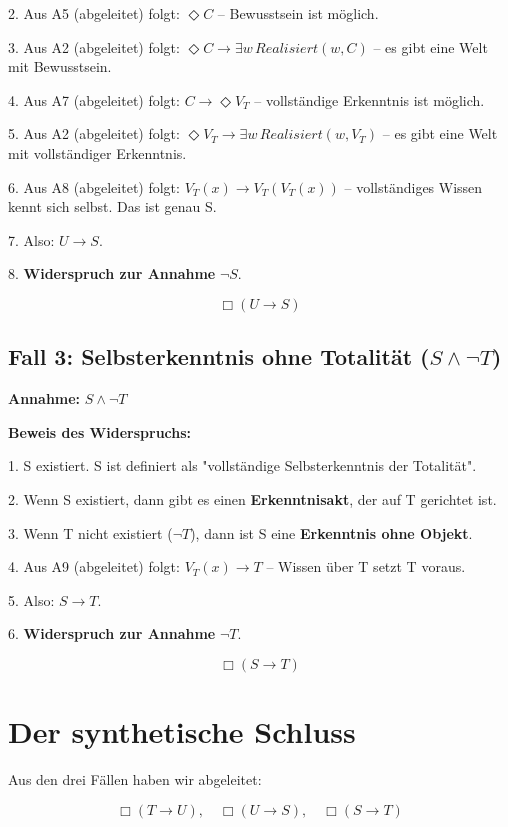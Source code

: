 \documentclass[
]{article}
\begin{document}
2. Aus A5 (abgeleitet) folgt: \(\Diamond C\) – Bewusstsein ist möglich.

3. Aus A2 (abgeleitet) folgt: \(\Diamond C \rightarrow \exists w\, Realisiert(w,C)\) – es gibt eine Welt mit Bewusstsein.

4. Aus A7 (abgeleitet) folgt: \(C \rightarrow \Diamond V_T\) – vollständige Erkenntnis ist möglich.

5. Aus A2 (abgeleitet) folgt: \(\Diamond V_T \rightarrow \exists w\, Realisiert(w,V_T)\) – es gibt eine Welt mit vollständiger Erkenntnis.

6. Aus A8 (abgeleitet) folgt: \(V_T(x) \rightarrow V_T(V_T(x))\) – vollständiges Wissen kennt sich selbst. Das ist genau S.

7. Also: \(U \rightarrow S\).

8. \textbf{Widerspruch zur Annahme} \(\neg S\).

\[
\boxed{\Box(U \rightarrow S)}
\]

\subsection{Fall 3: Selbsterkenntnis ohne Totalität (\(S \land \neg T\))}\label{fall-3-selbsterkenntnis-ohne-totalituxe4t-s-land-neg-t}

\textbf{Annahme:} \(S \land \neg T\)

\textbf{Beweis des Widerspruchs:}

1. S existiert. S ist definiert als "vollständige Selbsterkenntnis der Totalität".

2. Wenn S existiert, dann gibt es einen \textbf{Erkenntnisakt}, der auf T gerichtet ist.

3. Wenn T nicht existiert (\(\neg T\)), dann ist S eine \textbf{Erkenntnis ohne Objekt}.

4. Aus A9 (abgeleitet) folgt: \(V_T(x) \rightarrow T\) – Wissen über T setzt T voraus.

5. Also: \(S \rightarrow T\).

6. \textbf{Widerspruch zur Annahme} \(\neg T\).

\[
\boxed{\Box(S \rightarrow T)}
\]

\section{Der synthetische Schluss}\label{der-synthetische-schluss}

Aus den drei Fällen haben wir abgeleitet:

\[
\Box(T \rightarrow U), \quad \Box(U \rightarrow S), \quad \Box(S \rightarrow T)
\]
\end{document}
